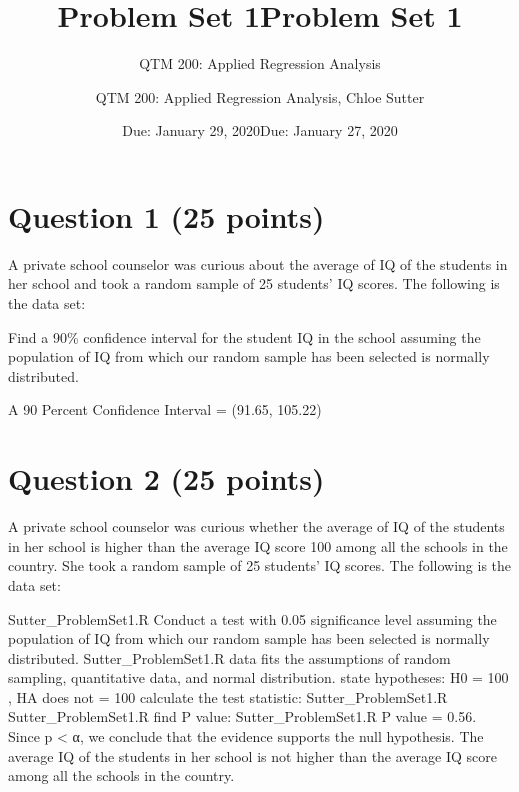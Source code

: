 \documentclass[12pt,letterpaper]{article}
\title{Problem Set 1}
\date{Due: January 29, 2020}
\author{QTM 200: Applied Regression Analysis}
\begin{document}
%



\title{Problem Set 1}
\date{Due: January 27, 2020}
\author{QTM 200: Applied Regression Analysis, Chloe Sutter}


\section*{Question 1 (25 points)}
A private school counselor was curious about the average of IQ of the students in her school and took a random sample of 25 students' IQ scores. The following is the data set:
  
\vspace{.5cm}
\noindent Find a 90\% confidence interval for the student IQ in the school assuming the population of IQ from which our random sample has been selected is normally distributed. 
\vspace{.5cm} 

\noindent A 90 Percent Confidence Interval = (91.65, 105.22)
\vspace{1cm}

\section*{Question 2 (25 points)}
\noindent A private school counselor was curious  whether  the average of IQ of the students in her school is higher than the average IQ score 100 among all the schools in the country. \noindent She took a random sample of 25 students' IQ scores. The following is the data set:

\vspace{.5cm}
 {Sutter_ProblemSet1.R}
\noindent Conduct a test with 0.05 significance level assuming the population of IQ from which our random sample has been selected is normally distributed. 
\vspace{.5cm}
 {Sutter_ProblemSet1.R}
\noindent data fits the assumptions of random sampling, quantitative data, and normal distribution.
\noindent state hypotheses: H0 = 100 , HA does not = 100
\noindent calculate the test statistic:
 {Sutter_ProblemSet1.R}
 {Sutter_ProblemSet1.R}
\noindent find P value:
 {Sutter_ProblemSet1.R}
\noindent P value = 0.56. Since p < α, we conclude that the evidence supports the null hypothesis. The average IQ of the students in her school is not higher than the average IQ score  among all the schools in the country.
\end{document}
